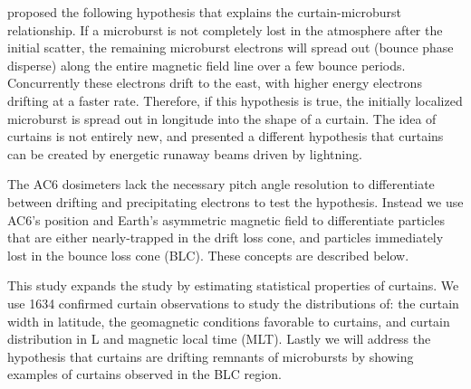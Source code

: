 \documentclass[draft]{agujournal2019}
\begin{document}
 proposed the following hypothesis that explains the curtain-microburst relationship. If a microburst is not completely lost in the atmosphere after the initial scatter, the remaining microburst electrons will spread out (bounce phase disperse) along the entire magnetic field line over a few bounce periods. Concurrently these electrons drift to the east, with higher energy electrons drifting at a faster rate. Therefore, if this hypothesis is true, the initially localized microburst is spread out in longitude into the shape of a curtain. The idea of curtains is not entirely new, and  presented a different hypothesis that curtains can be created by energetic runaway beams driven by lightning.

The AC6 dosimeters lack the necessary pitch angle resolution to differentiate between drifting and precipitating electrons to test the  hypothesis. Instead we use AC6's position and Earth's asymmetric magnetic field to differentiate particles that are either nearly-trapped in the drift loss cone, and particles immediately lost in the bounce loss cone (BLC). These concepts are described below.

This study expands the  study by estimating statistical properties of curtains. We use 1634 confirmed curtain observations to study the distributions of: the curtain width in latitude, the geomagnetic conditions favorable to curtains, and curtain distribution in L and magnetic local time (MLT). Lastly we will address the hypothesis that curtains are drifting remnants of microbursts by showing examples of curtains observed in the BLC region.
\end{document}

